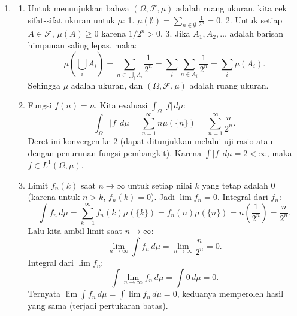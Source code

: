 \documentclass{article}
\begin{document}
\begin{enumerate}
  \item
        \begin{enumerate}[label=(\alph*)]
          \item Untuk menunjukkan bahwa $(\Omega, \mathcal{F}, \mu)$ adalah ruang ukuran, kita cek sifat-sifat ukuran untuk $\mu$:
                1. $\mu(\emptyset) = \sum_{n \in \emptyset} \frac{1}{2^n} = 0$.
                2. Untuk setiap $A \in \mathcal{F}$, $\mu(A) \ge 0$ karena $1/2^n > 0$.
                3. Jika $A_1, A_2, \dots$ adalah barisan himpunan saling lepas, maka:
                \[ \mu\left(\bigcup_i A_i\right) = \sum_{n \in \bigcup_i A_i} \frac{1}{2^n} = \sum_i \sum_{n \in A_i} \frac{1}{2^n} = \sum_i \mu(A_i). \]
                Sehingga $\mu$ adalah ukuran, dan $(\Omega, \mathcal{F}, \mu)$ adalah ruang ukuran.
          \item Fungsi $f(n) = n$. Kita evaluasi $\int_\Omega |f| \, d\mu$:
                \[
                  \int_\Omega |f| \, d\mu = \sum_{n=1}^\infty n \mu(\{n\}) = \sum_{n=1}^\infty \frac{n}{2^n}.
                \]
                Deret ini konvergen ke $2$ (dapat ditunjukkan melalui uji rasio atau dengan penurunan fungsi pembangkit). Karena $\int |f| \, d\mu = 2 < \infty$, maka $f \in L^1(\Omega, \mu)$.
          \item Limit $f_n(k)$ saat $n \to \infty$ untuk setiap nilai $k$ yang tetap adalah 0 (karena untuk $n > k$, $f_n(k) = 0$). Jadi $\lim f_n = 0$.
                Integral dari $f_n$:
                \[ \int f_n \, d\mu = \sum_{k=1}^\infty f_n(k) \mu(\{k\}) = f_n(n) \mu(\{n\}) = n \left(\frac{1}{2^n}\right) = \frac{n}{2^n}. \]
                Lalu kita ambil limit saat $n \to \infty$:
                \[ \lim_{n \to \infty} \int f_n \, d\mu = \lim_{n \to \infty} \frac{n}{2^n} = 0. \]
                Integral dari $\lim f_n$:
                \[ \int \lim_{n \to \infty} f_n \, d\mu = \int 0 \, d\mu = 0. \]
                Ternyata $\lim \int f_n \, d\mu = \int \lim f_n \, d\mu = 0$, keduanya memperoleh hasil yang sama (terjadi pertukaran batas).
        \end{enumerate}


\end{enumerate}
\end{document}
